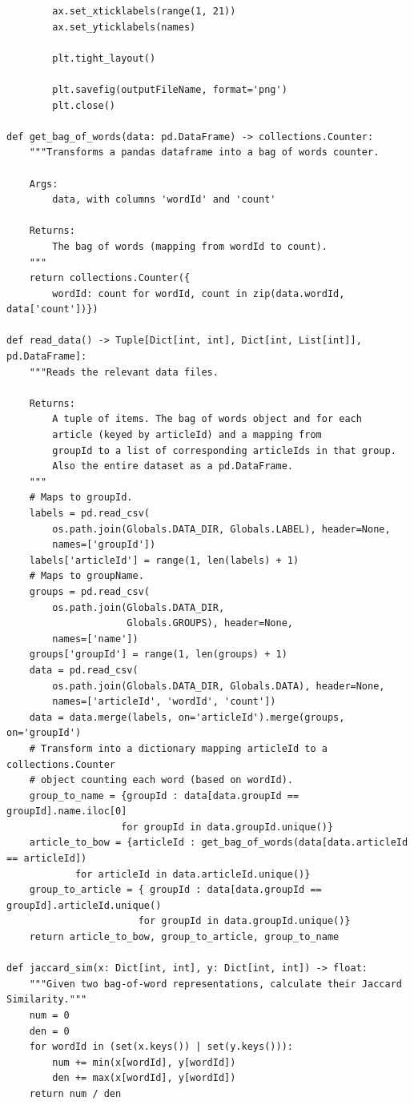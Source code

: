 \documentclass[12pt]{article}
\begin{document}
\begin{enumerate}[label=(\alph*)]
\begin{verbatim}
        ax.set_xticklabels(range(1, 21))
        ax.set_yticklabels(names)

        plt.tight_layout()

        plt.savefig(outputFileName, format='png')
        plt.close()

def get_bag_of_words(data: pd.DataFrame) -> collections.Counter:
    """Transforms a pandas dataframe into a bag of words counter.
    
    Args:
        data, with columns 'wordId' and 'count'
        
    Returns:
        The bag of words (mapping from wordId to count).
    """
    return collections.Counter({
        wordId: count for wordId, count in zip(data.wordId, data['count'])})
        
def read_data() -> Tuple[Dict[int, int], Dict[int, List[int]], pd.DataFrame]:
    """Reads the relevant data files.
    
    Returns:
        A tuple of items. The bag of words object and for each 
        article (keyed by articleId) and a mapping from
        groupId to a list of corresponding articleIds in that group.
        Also the entire dataset as a pd.DataFrame.
    """
    # Maps to groupId.
    labels = pd.read_csv(
        os.path.join(Globals.DATA_DIR, Globals.LABEL), header=None,
        names=['groupId'])
    labels['articleId'] = range(1, len(labels) + 1)
    # Maps to groupName.
    groups = pd.read_csv(
        os.path.join(Globals.DATA_DIR,
                     Globals.GROUPS), header=None,
        names=['name'])
    groups['groupId'] = range(1, len(groups) + 1)
    data = pd.read_csv(
        os.path.join(Globals.DATA_DIR, Globals.DATA), header=None,
        names=['articleId', 'wordId', 'count'])
    data = data.merge(labels, on='articleId').merge(groups, on='groupId')
    # Transform into a dictionary mapping articleId to a collections.Counter
    # object counting each word (based on wordId).
    group_to_name = {groupId : data[data.groupId == groupId].name.iloc[0]
                    for groupId in data.groupId.unique()}
    article_to_bow = {articleId : get_bag_of_words(data[data.articleId == articleId])
            for articleId in data.articleId.unique()}
    group_to_article = { groupId : data[data.groupId == groupId].articleId.unique()
                       for groupId in data.groupId.unique()}
    return article_to_bow, group_to_article, group_to_name   

def jaccard_sim(x: Dict[int, int], y: Dict[int, int]) -> float:
    """Given two bag-of-word representations, calculate their Jaccard Similarity."""
    num = 0
    den = 0
    for wordId in (set(x.keys()) | set(y.keys())):
        num += min(x[wordId], y[wordId])
        den += max(x[wordId], y[wordId])
    return num / den


\end{verbatim}
\end{enumerate}
\end{document}
